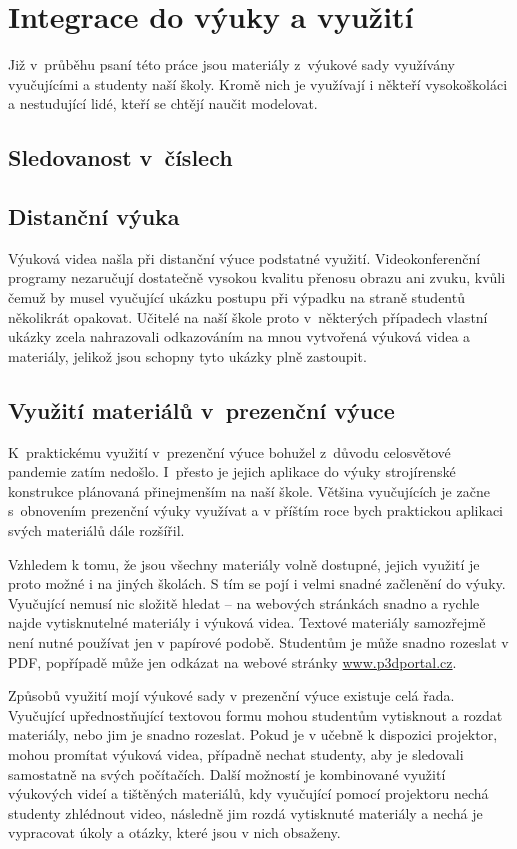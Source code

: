 \chapter{Integrace do výuky a využití}
Již v~průběhu psaní této práce jsou materiály z~výukové sady využívány vyučujícími a studenty naší školy.
Kromě nich je využívají i někteří vysokoškoláci a nestudující lidé, kteří se chtějí naučit modelovat.

\section{Sledovanost v~číslech}
\B{\textcolor{mygreen}{PŠ: Tuto sekci bych rád vztáhnul ke konkrétnímu datu a zmínil konkrétní čísla. Rád bych počkal ještě nějakou chvíli, mezitím by se sledovanost měla přehoupnout přes ty dva tisíce. TZN napíšu nejpozději ve středu večer... }\normalsize}

\section{Distanční výuka}
Výuková videa našla při distanční výuce podstatné využití.
Videokonferenční programy nezaručují dostatečně vysokou kvalitu přenosu obrazu ani zvuku, kvůli čemuž by musel vyučující ukázku postupu při výpadku na straně studentů několikrát opakovat.
Učitelé na naší škole proto v~některých případech vlastní ukázky zcela nahrazovali odkazováním na mnou vytvořená výuková videa a materiály, jelikož jsou schopny tyto ukázky plně zastoupit.
\B{\textcolor{red}{PŠ: DOPSAT PÁR VĚT.}}

\section{Využití materiálů v~prezenční výuce}
K~praktickému využití v~prezenční výuce bohužel z~důvodu celosvětové pandemie zatím nedošlo. 
I~přesto je jejich aplikace do výuky strojírenské konstrukce plánovaná přinejmenším na naší škole.
Většina vyučujících je začne s~obnovením prezenční výuky využívat a v příštím roce bych praktickou aplikaci svých materiálů dále rozšířil.

Vzhledem k tomu, že jsou všechny materiály volně dostupné, jejich využití je proto možné i na jiných školách.
S tím se pojí i velmi snadné začlenění do výuky.
Vyučující nemusí nic složitě hledat -- na webových stránkách snadno a rychle najde vytisknutelné materiály i výuková videa.
Textové materiály samozřejmě není nutné používat jen v papírové podobě. Studentům je může snadno rozeslat v PDF, popřípadě může jen odkázat na webové stránky \href{https://www.p3dportal.cz}{www.p3dportal.cz}.

Způsobů využití mojí výukové sady v prezenční výuce existuje celá řada.
Vyučující upřednostňující textovou formu mohou studentům vytisknout a rozdat materiály, nebo jim je snadno rozeslat.
Pokud je v učebně k dispozici projektor, mohou promítat výuková videa, případně nechat studenty, aby je sledovali samostatně na svých počítačích.
Další možností je kombinované využití výukových videí a tištěných materiálů, kdy vyučující pomocí projektoru nechá studenty zhlédnout video, následně jim rozdá vytisknuté materiály a nechá je vypracovat úkoly a otázky, které jsou v nich obsaženy.